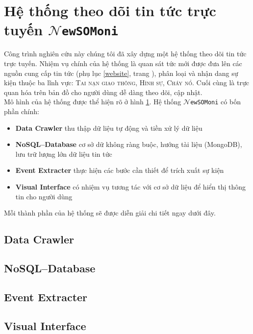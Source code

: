 \section{Hệ thống theo dõi tin tức trực tuyến  $\mathcal{N}$\texttt{ewSOMoni}}
\label{system}
\noindent Công trình nghiên cứu này chúng tôi đã xây dựng một hệ thống theo dõi tin tức trực tuyến. Nhiệm vụ chính của hệ thống là quan sát tức mới được đưa lên các nguồn cung cấp tin tức (phụ lục \ref{website}, trang \pageref{website}), phân loại và nhận dang sự kiện thuộc ba lĩnh vực: \textsc{Tai nạn giao thông}, \textsc{Hình sự}, \textsc{Cháy nổ}. Cuối cùng là trực quan hóa trên bản đồ cho người dùng dễ dàng theo dõi, cập nhật. \\
\noindent Mô hình của hệ thống được thể hiện rõ ở hình \ref{system}. Hệ thống $\mathcal{N}$\texttt{ewSOMoni} có bốn phần chính:
\begin{itemize}
  \item \textbf{Data Crawler} thu thập dữ liệu tự động và tiền xử lý dữ liệu
  \item \textbf{NoSQL--Database} cơ sở dữ không ràng buộc, hướng tài liệu (MongoDB), lưu trữ lượng  lớn dữ liệu tin tức
  \item \textbf{Event Extracter} thực hiện các bước cần thiết để trích xuất sự kiện
  \item \textbf{Visual Interface} có nhiệm vụ tương tác với cơ sở dữ liệu để hiển thị thông tin cho người dùng

  \end{itemize}

\noindent Mỗi thành phần của hệ thống sẽ được diễn giải chi tiết ngay dưới đây.

\subsection{Data Crawler}
\label{datacrawler}




\subsection{NoSQL--Database}
\label{db}

\subsection{Event Extracter}
\label{ee}


\subsection{Visual Interface}
\label{vi}






